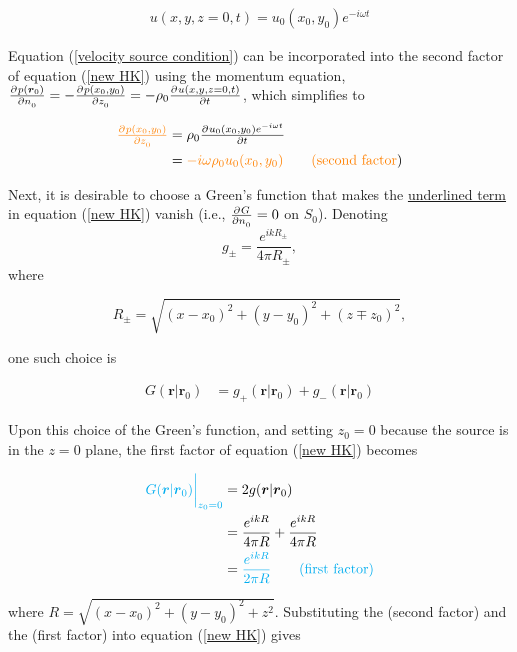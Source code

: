 \documentclass[12pt]{article}%
\begin{document}
\begin{align}\label{velocity source condition}
u(x,y,z=0,t) = u_0 (x_0,y_0) e^{-i\omega t}    
\end{align}

\noindent Equation (\ref{velocity source condition}) can be incorporated into the \color{orange}second factor \color{black} of equation (\ref{new HK}) using the momentum equation, $\pd{p(\boldsymbol r_0)}{n_0} =-\pd{p(x_0,y_0)}{z_0}= -\rho_0 \pd{u(x,y,z=0,t)}{t}$, which simplifies to

\begin{align*}
    \color{orange}\pd{p(x_0,y_0)}{z_0} \color{black}&= \rho_0 \pd{u_0(x_0,y_0)e^{-i\omega t}}{t}\\
    &= \color{orange} -i\omega \rho_0 u_0(x_0, y_0) \tag{\color{orange} second factor\color{black}}
\end{align*}


\noindent Next, it is desirable to choose a Green's function that makes the \underline{underlined term} in equation (\ref{new HK}) vanish (i.e., $\pd{G}{n_0} = 0$ on $S_0$). Denoting 
$$g_\pm = \frac{e^{ikR_\pm}}{4\pi R_\pm},$$ 
\noindent where 

$$R_\pm = \sqrt{(x-x_0)^2 + (y-y_0)^2 + (z\mp z_0)^2},$$ 

\noindent one such choice is 

\begin{align}\label{Green's function for derivation}
G(\boldsymbol r | \boldsymbol r_0) &= g_+(\boldsymbol r | \boldsymbol r_0) + g_-(\boldsymbol r | \boldsymbol r_0)   
\end{align}
 
\noindent Upon this choice of the Green's function, and setting $z_0 = 0$ because the source is in the $z=0$ plane, the \color{cyan} first factor \color{black} of equation (\ref{new HK}) becomes

\begin{align*}
\color{cyan} G(\boldsymbol r|\boldsymbol r_0) \bigg\rvert_{z_0=0} \color{black}  &=2g(\boldsymbol r|\boldsymbol r_0) \\ 
&= \frac{e^{ikR}}{4\pi R} + \frac{e^{ikR}}{4\pi R}\\
&= \color{cyan} \frac{e^{ikR}}{2\pi R} \tag{\color{cyan} first factor} 
\end{align*}

\color{black}

\noindent where \color{cyan}  $R = \sqrt{(x-x_0)^2 + (y-y_0)^2 + z^2}$\color{black}. Substituting the (\color{orange}second factor\color{black})   and the (\color{cyan}first factor\color{black})  into equation (\ref{new HK}) gives
\end{document}
